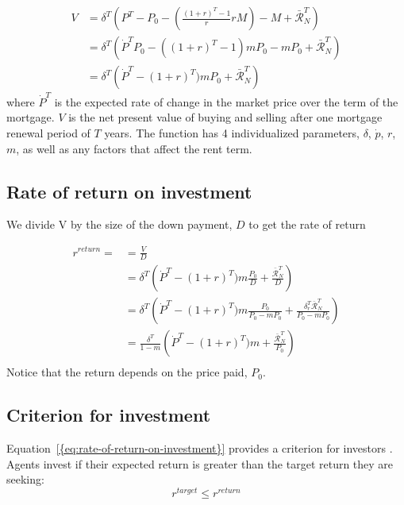 { \begin{align}
V &= \delta^T\left( P^T-P_0- \left(\frac{(1+r)^T-1}{r}rM\right)- M+ \mathcal{\bar{R}}^T_N \right)      \\
&= \delta^T \left(
\dot P^T P_0 -\left((1+r)^T-1\right)mP_0-mP_0
 +  \mathcal{\bar{R}}^T_N \right) 
\label{first_sub}\\
  &= \delta^T \left(\dot P^T - (1+r)^T)m P_0 + \mathcal{\bar{R}}^T_N\right)
\end{align}
where $\dot P^T$  is the expected rate of change in the market price over the term of the mortgage.
$V$ is the net present value of buying and selling after one mortgage renewal period of $T$ years. %
The function has 4 individualized  parameters, $\delta$, $\dot p$, $r$, $m$, as well as any factors that affect the rent term.


{\color{red}

\subsection{Rate of return on investment}
We divide V by the size of the down payment, $D$ to get the  rate of return  

\begin{align}
r^{return} =
  &= \frac{V}{D}  \nonumber \\
  &= \delta^T \left(\dot P^T - (1+r)^T)m \frac{P_0}{D} + \frac{\mathcal{\bar{R}}^T_N}{D}\right)\\
  &= \delta^T \left(\dot P^T - (1+r)^T)m \frac{P_0}{P_0-mP_0} + \frac{\delta_r^T\mathcal{\bar{R}}^T_N}{P_0-mP_0}\right)\\  
  &= \frac{\delta^T}{1-m} \left(\dot P^T - (1+r)^T)m  + \frac{\mathcal{\bar{R}}^T_N}{P_0}\right)\\
\end{align}
Notice that the return depends on the price paid, $P_0$.

\subsection{Criterion for investment}
Equation~\ref{{eq:rate-of-return-on-investment}} provides a criterion for investors
.%
 Agents invest if  their expected return is greater than the target return they are seeking:
\begin{equation}
r^{target}\le r^{return} 
\label{eqn-property-investment-return2}
\end{equation}

}}
